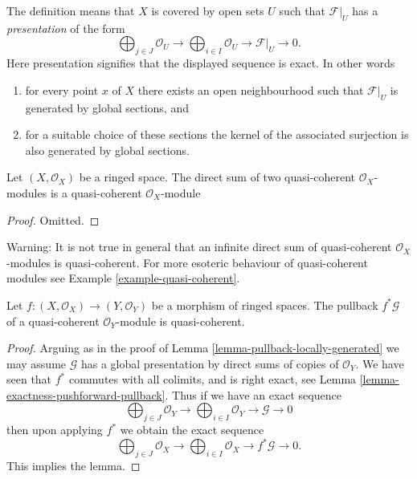 \noindent
The definition means that $X$ is covered by open sets $U$
such that $\mathcal{F}|_U$ has a {\it presentation}
of the form
$$
\bigoplus\nolimits_{j \in J}
\mathcal{O}_U
\longrightarrow
\bigoplus\nolimits_{i \in I}
\mathcal{O}_U
\to
\mathcal{F}|_U
\to
0.
$$
Here presentation signifies that the displayed
sequence is exact. In other words
\begin{enumerate}
\item for every point $x$ of $X$ there exists
an open neighbourhood such that $\mathcal{F}|_U$
is generated by global sections, and
\item for a suitable choice of these sections
the kernel of the associated surjection is also
generated by global sections.
\end{enumerate}

\begin{lemma}
\label{lemma-direct-sum-quasi-coherent}
Let $(X, \mathcal{O}_X)$ be a ringed space.
The direct sum of two quasi-coherent $\mathcal{O}_X$-modules is
a quasi-coherent $\mathcal{O}_X$-module
\end{lemma}

\begin{proof}
Omitted.
\end{proof}

\begin{remark}
\label{remark-infinite-direct-sum-quasi-coherent-not}
Warning: It is not true in general that an infinite
direct sum of quasi-coherent $\mathcal{O}_X$-modules
is quasi-coherent. For more esoteric behaviour of quasi-coherent
modules see Example \ref{example-quasi-coherent}.
\end{remark}

\begin{lemma}
\label{lemma-pullback-quasi-coherent}
Let $f : (X, \mathcal{O}_X) \to (Y, \mathcal{O}_Y)$
be a morphism of ringed spaces.
The pullback $f^*\mathcal{G}$ of a quasi-coherent
$\mathcal{O}_Y$-module is quasi-coherent.
\end{lemma}

\begin{proof}
Arguing as in the proof of Lemma \ref{lemma-pullback-locally-generated}
we may assume $\mathcal{G}$ has a global presentation by
direct sums of copies of $\mathcal{O}_Y$.
We have seen that $f^*$ commutes with all colimits,
and is right exact, see Lemma \ref{lemma-exactness-pushforward-pullback}.
Thus if we have an exact sequence
$$
\bigoplus\nolimits_{j \in J}
\mathcal{O}_Y
\longrightarrow
\bigoplus\nolimits_{i \in I}
\mathcal{O}_Y
\to
\mathcal{G}
\to
0
$$
then upon applying $f^*$ we obtain the exact sequence
$$
\bigoplus\nolimits_{j \in J}
\mathcal{O}_X
\longrightarrow
\bigoplus\nolimits_{i \in I}
\mathcal{O}_X
\to
f^*\mathcal{G}
\to
0.
$$
This implies the lemma.
\end{proof}

